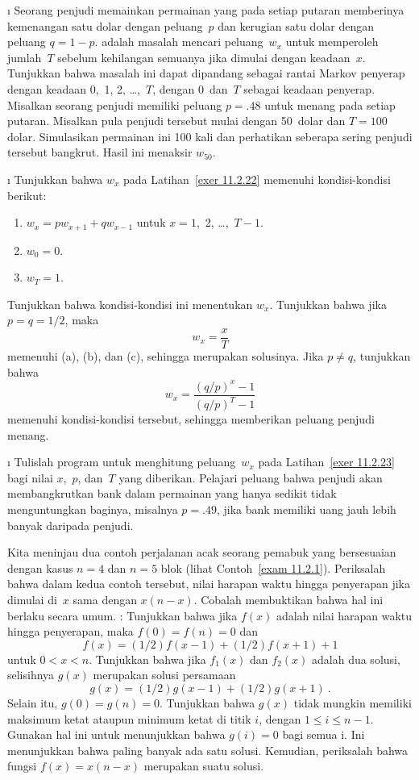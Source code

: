 \begin{LJSItem}
\i\label{exer 11.2.22} Seorang penjudi memainkan permainan yang pada setiap
putaran memberinya kemenangan satu dolar dengan peluang~$p$ dan kerugian satu
dolar dengan peluang $q = 1 - p$.  adalah masalah mencari peluang~$w_x$ untuk memperoleh
jumlah~$T$ sebelum kehilangan semuanya jika dimulai dengan keadaan~$x$.
Tunjukkan bahwa masalah ini dapat dipandang sebagai rantai Markov penyerap
dengan keadaan 0,~1, 2, \ldots,~$T$, dengan 0~dan~$T$ sebagai keadaan penyerap.
Misalkan seorang penjudi memiliki peluang $p = .48$ untuk menang pada setiap
putaran. Misalkan pula penjudi tersebut mulai dengan 50~dolar dan $T = 100$
dolar. Simulasikan permainan ini 100 kali dan perhatikan seberapa sering penjudi
tersebut bangkrut. Hasil ini menaksir $w_{50}$.

\i\label{exer 11.2.23} Tunjukkan bahwa $w_x$ pada
Latihan~\ref{exer 11.2.22} memenuhi kondisi-kondisi berikut:
\begin{enumerate}

\item $w_x = pw_{x + 1} + qw_{x - 1}$ untuk $x = 1$,~2, \ldots,\ $T - 1$.

\item $w_0 = 0$.

\item $w_T = 1$.
\end{enumerate}

\noindent Tunjukkan bahwa kondisi-kondisi ini menentukan $w_x$. Tunjukkan bahwa
jika $p = q = 1/2$, maka
$$
w_x = \frac xT
$$
memenuhi (a), (b), dan (c), sehingga merupakan solusinya. Jika $p \ne q$,
tunjukkan bahwa
$$
w_x = \frac{(q/p)^x - 1}{(q/p)^T - 1}
$$
memenuhi kondisi-kondisi tersebut, sehingga memberikan peluang penjudi menang.

\i\label{exer 11.2.24} Tulislah program untuk menghitung peluang~$w_x$ pada
Latihan~\ref{exer 11.2.23} bagi nilai $x$,~$p$, dan~$T$ yang diberikan. Pelajari
peluang bahwa penjudi akan membangkrutkan bank dalam permainan yang hanya
sedikit tidak menguntungkan baginya, misalnya $p = .49$, jika bank memiliki uang
jauh lebih banyak daripada penjudi.

\istar\label{exer 11.2.25} Kita meninjau dua contoh perjalanan acak seorang
pemabuk yang bersesuaian dengan kasus $n =
4$ dan $n = 5$ blok (lihat Contoh~\ref{exam 11.2.1}). Periksalah bahwa dalam
kedua contoh tersebut, nilai harapan waktu hingga penyerapan jika dimulai
di~$x$ sama dengan $x(n - x)$. Cobalah membuktikan bahwa hal ini berlaku secara
umum. : Tunjukkan bahwa jika $f(x)$ adalah nilai harapan waktu
hingga penyerapan, maka $f(0) = f(n) = 0$ dan
$$f(x) = (1/2)f(x - 1) + (1/2)f(x + 1) + 1$$
untuk $0 < x < n$. Tunjukkan bahwa jika $f_1(x)$ dan $f_2(x)$ adalah dua
solusi, selisihnya $g(x)$ merupakan solusi persamaan
$$g(x) = (1/2)g(x - 1) + (1/2)g(x + 1)\ .$$
Selain itu, $g(0) = g(n) = 0$. Tunjukkan bahwa $g(x)$ tidak mungkin memiliki
maksimum ketat ataupun minimum ketat di titik $i$, dengan $1 \le i \le n-1$.
Gunakan hal ini untuk menunjukkan bahwa $g(i) = 0$ bagi semua i. Ini menunjukkan
bahwa paling banyak ada satu solusi. Kemudian, periksalah bahwa fungsi
$f(x) = x(n-x)$ merupakan suatu solusi.


\end{LJSItem}
